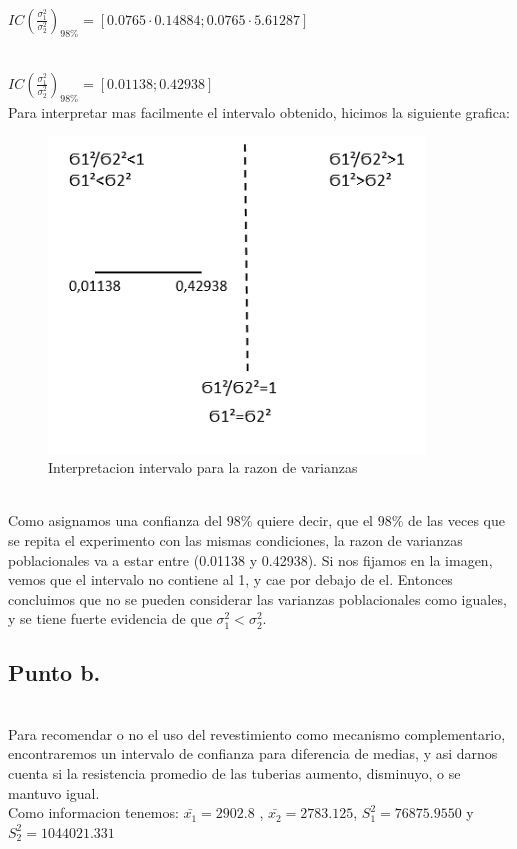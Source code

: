 \documentclass[letterpaper,12pt,onecolumn,titlepage]{article}
\begin{document}
~\\ $IC(\frac{\sigma_1^{2}}{\sigma_2^{2}})_{98\%}=[0.0765\cdot0.14884  ;  0.0765\cdot5.61287]$

~\\ $IC(\frac{\sigma_1^{2}}{\sigma_2^{2}})_{98\%}=[0.01138 ; 0.42938]$
~\\ Para interpretar mas facilmente el intervalo obtenido, hicimos la siguiente grafica:
\begin{figure}[!h]
    \begin{center}
        \includegraphics[width=10cm]{Figuras/Grafico4.png}
        \caption{Interpretacion intervalo para la razon de varianzas}
        \label{fig:Densidad}
    \end{center}
\end{figure}
~\\ Como asignamos una confianza del $98\%$ quiere decir, que el $98\%$ de las veces que se repita el experimento con las mismas condiciones, la razon de varianzas poblacionales va a estar entre (0.01138 y 0.42938). Si nos fijamos en la imagen, vemos que el intervalo no contiene al 1, y cae por debajo de el. Entonces concluimos que no se pueden considerar las varianzas poblacionales como iguales, y se tiene fuerte evidencia de que $\sigma_{1}^2<\sigma_{2}^2$.
\subsection{Punto b.}
~\\ Para recomendar o no el uso del revestimiento como mecanismo complementario, encontraremos un intervalo de confianza para diferencia de medias, y asi darnos cuenta si la resistencia promedio de las tuberias aumento, disminuyo, o se mantuvo igual.
~\\ Como informacion tenemos: $\bar{x_1}=2902.8$ , $\bar{x_2}=2783.125$, $S_{1}^2=76875.9550$ y $S_{2}^2=1044021.331$
\end{document}
